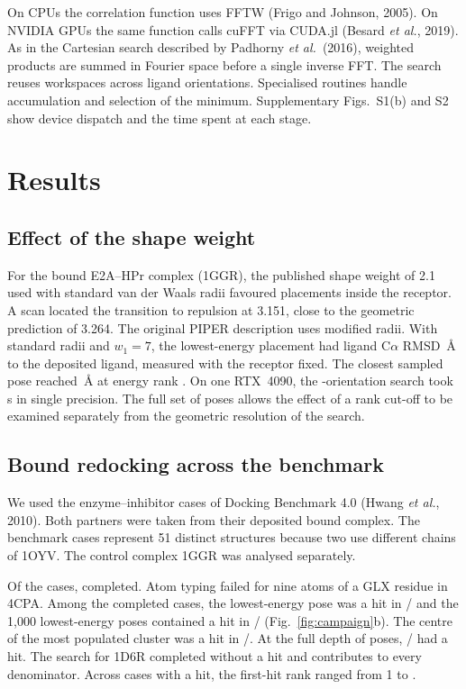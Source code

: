 \documentclass[10pt,twocolumn]{article}
\begin{document}
On CPUs the correlation function uses FFTW (Frigo and Johnson, 2005).
On NVIDIA GPUs the same function calls cuFFT via CUDA.jl (Besard \textit{et al.}, 2019).
As in the Cartesian search described by Padhorny \textit{et al.}\ (2016),
weighted products are summed in Fourier space before a single inverse FFT.
The search reuses workspaces across ligand orientations.
Specialised routines handle accumulation and selection of the minimum.
Supplementary Figs.~S1(b) and S2 show device dispatch and the time spent
at each stage.

\section{Results}
\subsection{Effect of the shape weight}
For the bound E2A--HPr complex (1GGR), the published shape weight of 2.1 used
with standard van der Waals radii favoured placements inside the receptor.
A scan located the transition to repulsion at 3.151, close to the geometric
prediction of 3.264. The original PIPER description uses modified radii. With
standard radii and $w_1=7$, the lowest-energy placement had ligand C$\alpha$ RMSD
\dockRmsd\,\AA{} to the deposited ligand, measured with the receptor fixed.
The closest sampled pose reached \dockBest\,\AA{} at energy rank \dockBestRank.
On one RTX~4090, the \dockNrot{}-orientation search took \dockGpuFThirtyTwo\,s
in single precision. The full set of poses allows the effect of a rank cut-off
to be examined separately from the geometric resolution of the search.

\subsection{Bound redocking across the benchmark}
We used the enzyme--inhibitor cases of Docking Benchmark 4.0
(Hwang \textit{et al.}, 2010). Both partners were taken from their deposited
bound complex. The \campCases{} benchmark
cases represent 51 distinct structures because two use different chains of
1OYV. The control complex 1GGR was analysed separately.

Of the \campCases{} cases, \campOk{} completed. Atom typing failed for nine
atoms of a GLX residue in 4CPA. Among the completed cases, the lowest-energy
pose was a hit in \campRankOne{}/\campOk{} and the 1,000 lowest-energy poses
contained a hit in \campHitTopK{}/\campOk{} (Fig.~\ref{fig:campaign}b).
The centre of the most populated cluster was a hit in \campClusterOne{}/\campOk{}.
At the full depth of \campNrot{} poses, \campHitAll{}/\campOk{} had a hit.
The search for 1D6R completed without a hit and contributes to every denominator.
Across cases with a hit, the first-hit rank ranged from 1 to \campMaxHitRank{}.
\end{document}
